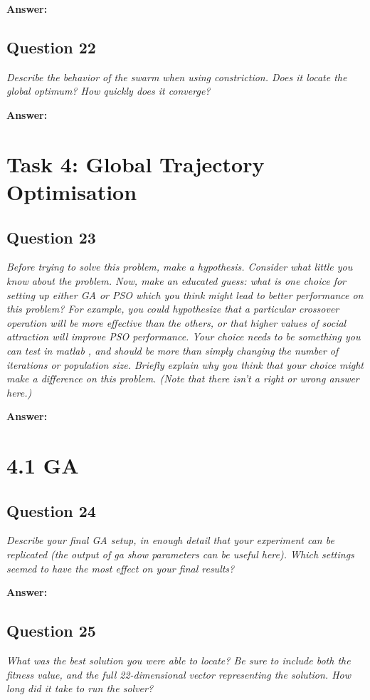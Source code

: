 \documentclass[a4paper]{article}
\begin{document}
\textbf{Answer:}

\subsection*{Question 22}
\emph{Describe the behavior of the swarm when using constriction.
Does it locate the global optimum? How quickly does it converge?}

\textbf{Answer:}

\section*{Task 4: Global Trajectory Optimisation}

\subsection*{Question 23}
\emph{Before trying to solve this problem, make a hypothesis. Consider what little you know about the problem. Now, make an educated guess: what is one choice for setting up either GA or PSO which you think might lead to better performance on this problem? For example, you could hypothesize that a particular crossover operation will be more effective than the others, or that higher values of social attraction will improve PSO performance. Your choice needs to be something you can test in matlab , and should be more than simply changing the number of iterations or population size. Briefly explain why you
think that your choice might make a difference on this problem. (Note that there isn’t a right or wrong answer here.)}

\textbf{Answer:}

\section*{4.1 GA}

\subsection*{Question 24}
\emph{Describe your final GA setup, in enough detail that your experiment can be replicated (the output of ga show parameters can be useful here). Which settings seemed to have the most effect on your final results?}

\textbf{Answer:}

\subsection*{Question 25}
\emph{What was the best solution you were able to locate? Be sure to
include both the fitness value, and the full 22-dimensional vector representing
the solution. How long did it take to run the solver?}
\end{document}
